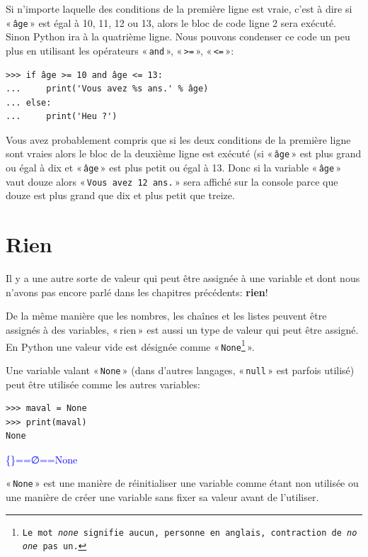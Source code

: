 Si n'importe laquelle des conditions de la première ligne est vraie, c'est à dire si  « \texttt{âge} » est égal à 10, 11, 12 ou 13, alors le bloc de code ligne 2 sera exécuté. Sinon Python ira à la quatrième ligne. 
Nous pouvons condenser ce code un peu plus en utilisant les opérateurs « \texttt{and} », « \texttt{>=} », « \texttt{<=} »:

\begin{Verbatim}[frame=single,rulecolor=\color{green}, label=à taper avec attention]
>>> if âge >= 10 and âge <= 13:
...     print('Vous avez %s ans.' % âge)
... else:
...     print('Heu ?')
\end{Verbatim}

Vous avez probablement compris que si les deux conditions de la première ligne sont vraies alors le bloc de la deuxième ligne est exécuté (si « \texttt{âge} »  est plus grand ou égal à dix et « \texttt{âge} » est plus petit ou égal à 13. Donc si la variable « \texttt{âge} » vaut douze alors « \texttt{Vous avez 12 ans.} » sera affiché sur la console parce que douze est plus grand que dix et plus petit que treize.

\section{Rien}
Il y a une autre sorte de valeur qui peut être assignée à une variable et dont nous n'avons pas encore parlé dans les chapitres précédents: \textbf{rien}!

De la même manière que les nombres, les chaînes et les listes peuvent être assignés à des variables, « {rien} »  est aussi un type de valeur qui peut être assigné. En Python une valeur vide est désignée comme « \texttt{None\footnote{Le mot \emph{none} signifie aucun, personne en anglais, contraction de \emph{no one} pas un.}} ».

Une variable valant « \texttt{None} » (dans d'autres langages, « \texttt{null} » est parfois utilisé) peut être utilisée comme les autres variables:

\begin{Verbatim}[frame=single,rulecolor=\color{mbleu}, label=à taper]
>>> maval = None
>>> print(maval)
None
\end{Verbatim}

\begin{center}
\textcolor{blue}{\textrm{\{\}==∅==None}}
\end{center}

« \texttt{None} » est une manière de réinitialiser une variable comme étant non utilisée ou une manière de créer une variable sans fixer sa valeur avant de l'utiliser.

